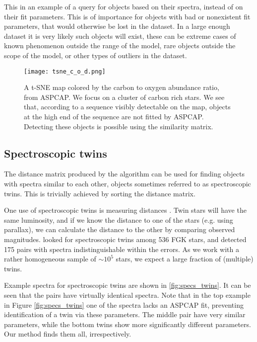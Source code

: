 \documentclass[fleqn,usenatbib]{mnras}
\begin{document}
This in an example of a query for objects based on their spectra, instead of on their fit parameters. This is of importance for objects with bad or nonexistent fit parameters, that would otherwise be lost in the dataset. In a large enough dataset it is very likely such objects will exist,  these can be extreme cases of known phenomenon outside the range of the model,  rare objects outside the scope of the model, or other types of outliers in the dataset.
\begin{figure}
\begin{center}
  \texttt{[image: tsne\_c\_o\_d.png]}
  \caption{A t-SNE map colored by the carbon to oxygen abundance ratio, from ASPCAP. We focus on a cluster of carbon rich stars. We see that, according to a sequence visibly detectable on the map, objects at the high end of the sequence are not fitted by ASPCAP. Detecting these objects is possible using the similarity matrix.}
  \label{fig:tsne_carbon}
  \end{center}
\end{figure}

\subsection{Spectroscopic twins}
\label{sec:twins}
The distance matrix produced by the algorithm can be used for finding objects with spectra similar to each other, objects sometimes referred to as spectroscopic twins. This is trivially achieved by sorting the distance matrix.

One use of spectroscopic twins is measuring distances \citep{jofre15}. Twin stars will have the same luminosity, and if we know the distance to one of the stars (e.g. using parallax), we can calculate the distance to the other by comparing observed magnitudes. \citet{jofre15} looked for spectroscopic twins among 536 FGK stars, and detected 175 pairs with spectra indistinguishable within the errors.  As we work with a rather homogeneous sample of $\sim 10^5$ stars, we expect a large fraction of (multiple) twins. 

Example spectra for spectroscopic twins are shown in \ref{fig:specs_twins}. It can be seen that the pairs have virtually identical spectra. Note that in the top example in Figure \ref{fig:specs_twins} one of the spectra lacks an ASPCAP fit, preventing identification of a twin via these parameters. The middle pair have very similar parameters, while the bottom twins show more significantly different parameters. Our method finds them all, irrespectively.
\end{document}
